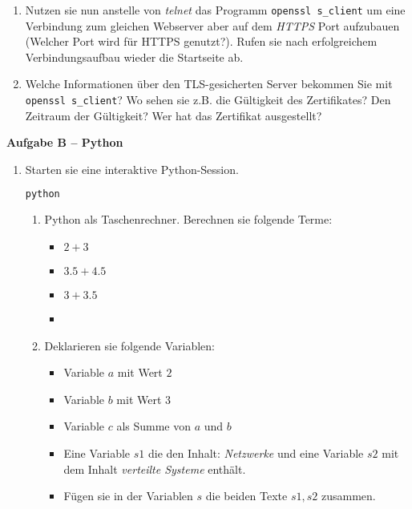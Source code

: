 \documentclass[paper=a4,fontsize=11pt]{scrartcl}%
\numberwithin{equation}{section}
\begin{document}
\begin{enumerate}
\begin{enumerate}
 		\item Nutzen sie nun anstelle von \emph{telnet} das Programm \texttt{openssl s\_client} um eine Verbindung zum gleichen Webserver aber auf dem \emph{HTTPS} Port aufzubauen (Welcher Port wird für HTTPS genutzt?). Rufen sie nach erfolgreichem Verbindungsaufbau wieder die Startseite ab.
 		\item Welche Informationen über den TLS-gesicherten Server bekommen Sie mit \texttt{openssl s\_client}? Wo sehen sie z.B. die Gültigkeit des Zertifikates? Den Zeitraum der Gültigkeit? Wer hat das Zertifikat ausgestellt?
	\end{enumerate}
\end{enumerate}

\begin{center}\Large{\textbf{Aufgabe B -- Python}}\end{center}\vskip0.25in
\begin{enumerate}
	\item Starten sie eine interaktive Python-Session.
	\begin{lstlisting}[style=Bash, language=Bash]
python
\end{lstlisting}
	\begin{enumerate}
		\item Python als Taschenrechner. Berechnen sie folgende Terme:
		\begin{itemize}
			\item $2 + 3$
			\item $3.5 + 4.5$
			\item $3 + 3.5$
			\item 
		\end{itemize}
		\item Deklarieren sie folgende Variablen:
		\begin{itemize}
			\item Variable $a$ mit Wert $2$
			\item Variable $b$ mit Wert $3$
			\item Variable $c$ als Summe von $a$ und $b$
			\item Eine Variable $s1$ die den Inhalt: \emph{Netzwerke} und eine Variable $s2$ mit dem Inhalt \emph{verteilte Systeme} enthält.
			\item Fügen sie in der Variablen $s$ die beiden Texte $s1, s2$ zusammen.
		\end{itemize}
	\end{enumerate}
\end{enumerate}
\end{document}
